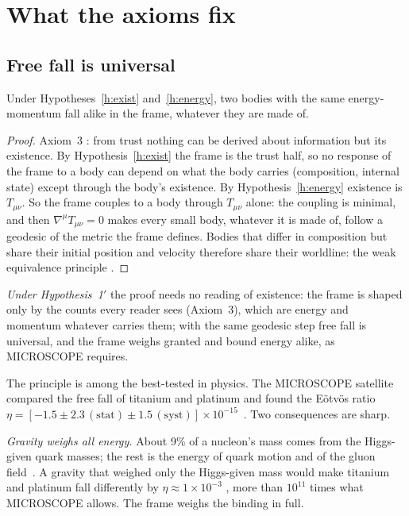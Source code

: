 \section{What the axioms fix}\label{sec:fix}

\subsection{Free fall is universal}

\begin{proposition}\label{pr:wep}
Under Hypotheses~\ref{h:exist} and~\ref{h:energy}, two bodies with the same energy-momentum fall alike in the frame, whatever
they are made of.
\end{proposition}

\begin{proof}
Axiom~3 \tagD: from trust nothing can be derived about information but its existence. By Hypothesis~\ref{h:exist} the frame is
the trust half, so no response of the frame to a body can depend on what the body carries (composition, internal state) except through
the body's existence. By Hypothesis~\ref{h:energy} existence is $T_{\mu\nu}$. So the frame couples to a body through $T_{\mu\nu}$ alone:
the coupling is minimal, and then $\nabla^\mu T_{\mu\nu}=0$ makes every small body, whatever it is made of, follow a geodesic of the
metric the frame defines. Bodies that differ in composition but share their initial position and velocity therefore share their
worldline: the weak equivalence principle \tagP.
\end{proof}

\noindent \emph{Under Hypothesis~1$'$} the proof needs no reading of existence: the frame is shaped only by the counts every reader
sees (Axiom~3), which are energy and momentum whatever carries them; with the same geodesic step free fall is universal, and the frame
weighs granted and bound energy alike, as MICROSCOPE requires.

The principle is among the best-tested in physics. The MICROSCOPE satellite compared the free fall of titanium and platinum and found the
E\"otv\"os ratio $\eta=[-1.5\pm2.3\,(\text{stat})\pm1.5\,(\text{syst})]\times10^{-15}$~\cite{microscope}. Two consequences are sharp.

\emph{Gravity weighs all energy.} About 9\% of a nucleon's mass comes from the Higgs-given quark masses; the rest is the energy of quark
motion and of the gluon field~\cite{yang}. A gravity that weighed only the Higgs-given mass would make titanium and platinum fall
differently by $\eta\approx1\times10^{-3}$ , more than $10^{11}$ times what MICROSCOPE allows. The frame weighs the binding in full.


